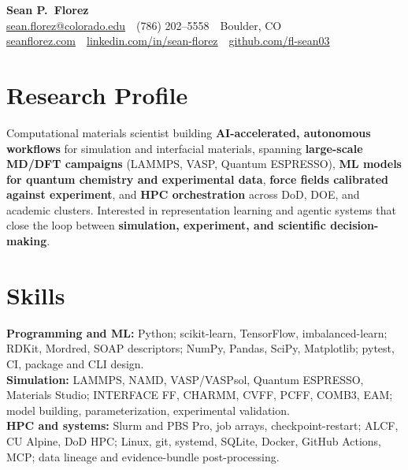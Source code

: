 \documentclass[letterpaper,10pt]{article}
\newcommand{\keepsection}{\needspace{6\baselineskip}}
\begin{document}
\pagestyle{empty}

\begin{center}
    {\LARGE \textbf{Sean P.\ Florez}}\\
    \href{mailto:sean.florez@colorado.edu}{sean.florez@colorado.edu} \,\textbar\, (786) 202--5558 \,\textbar\, Boulder, CO\\
    \href{https://seanflorez.com}{seanflorez.com} \,\textbar\,
    \href{https://linkedin.com/in/sean-florez}{linkedin.com/in/sean-florez} \,\textbar\,
    \href{https://github.com/fl-sean03}{github.com/fl-sean03}
\end{center}

\keepsection\section*{Research Profile}
Computational materials scientist building \textbf{AI-accelerated, autonomous workflows} for simulation and interfacial materials, spanning \textbf{large-scale MD/DFT campaigns} (LAMMPS, VASP, Quantum ESPRESSO), \textbf{ML models for quantum chemistry and experimental data}, \textbf{force fields calibrated against experiment}, and \textbf{HPC orchestration} across DoD, DOE, and academic clusters. Interested in representation learning and agentic systems that close the loop between \textbf{simulation, experiment, and scientific decision-making}.

\keepsection\section*{Skills}
\textbf{Programming and ML:} Python; scikit-learn, TensorFlow, imbalanced-learn; RDKit, Mordred, SOAP descriptors; NumPy, Pandas, SciPy, Matplotlib; pytest, CI, package and CLI design.\\
\textbf{Simulation:} LAMMPS, NAMD, VASP/VASPsol, Quantum ESPRESSO, Materials Studio; INTERFACE FF, CHARMM, CVFF, PCFF, COMB3, EAM; model building, parameterization, experimental validation.\\
\textbf{HPC and systems:} Slurm and PBS Pro, job arrays, checkpoint-restart; ALCF, CU Alpine, DoD HPC; Linux, git, systemd, SQLite, Docker, GitHub Actions, MCP; data lineage and evidence-bundle post-processing.
\end{document}

